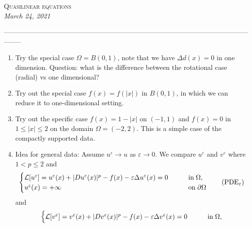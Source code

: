 \documentclass[10pt]{article}
\newcommand{\setfont}[2]{{\fontfamily{#1}\selectfont #2}}
\theoremstyle{plain}
\theoremstyle{remark}
\begin{document}
\begin{center}
{\LARGE \textsc{Quasilinear equations}}\\
{\textit{March 24, 2021}}
\end{center}



\begin{center}
--------------------------------------------------------------------------------------------------------------------
\end{center}

\begin{enumerate}
    \item Try the special case $\Omega = B(0,1)$, note that we have $\Delta d(x) = 0$ in one dimension. Question: what is the difference between the rotational case (radial) vs one dimensional? 
    \item Try out the special case $f(x) = f(|x|)$ in $B(0,1)$, in which we can reduce it to one-dimensional setting.
    \item Try out the specific case $f(x) = 1-|x|$ on $(-1,1)$ and $f(x) = 0$ in $1\leq |x|\leq 2$ on the domain $\Omega = (-2,2)$. This is a simple case of the compactly supported data.
    \item Idea for general data: Assume $u^\varepsilon\to u$ as $\varepsilon\to 0$. We compare $u^\varepsilon$ and $v^\varepsilon$ where $1<p\leq 2$ and
\begin{equation}\label{eq:PDEeps}
    \begin{cases}
   \mathcal{L}[u^\varepsilon] =  u^\varepsilon(x) + |Du^\varepsilon(x)|^p - f(x) - \varepsilon \Delta u^\varepsilon(x) = 0 &\qquad
    \text{in}\;\Omega, \vspace{0cm}\\
   u^\varepsilon(x) = +\infty &\qquad
    \text{on}\;\partial\Omega
    \end{cases} \tag{PDE$_\varepsilon$}
\end{equation}
and
\begin{equation}\label{eq:vPDEeps}
    \begin{cases}
   \mathcal{L}[v^\varepsilon] =  v^\varepsilon(x) + |Dv^\varepsilon(x)|^p - f(x) - \varepsilon \Delta v^\varepsilon(x) = 0 &\qquad
    \text{in}\;\Omega, \vspace{0cm}\\

\end{cases}
\end{equation}
\end{enumerate}
\end{document}
